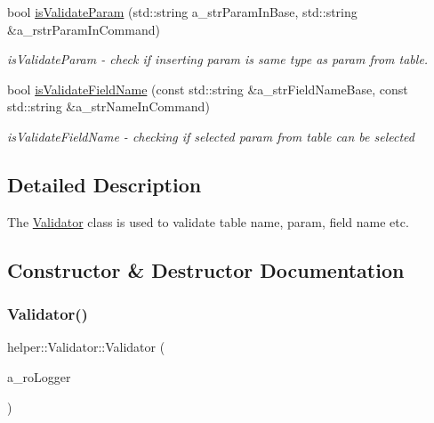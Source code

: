 \begin{DoxyCompactItemize}
bool \mbox{\hyperlink{classhelper_1_1_validator_ac2ff8db85b517ac2a1ccd4e20ec13889}{is\+Validate\+Param}} (std\+::string a\+\_\+str\+Param\+In\+Base, std\+::string \&a\+\_\+rstr\+Param\+In\+Command)
\begin{DoxyCompactList}\small\item\em is\+Validate\+Param -\/ check if inserting param is same type as param from table. \end{DoxyCompactList}\item 
bool \mbox{\hyperlink{classhelper_1_1_validator_ab0e104f0d9f8701af8b9b7980ea13ec4}{is\+Validate\+Field\+Name}} (const std\+::string \&a\+\_\+str\+Field\+Name\+Base, const std\+::string \&a\+\_\+str\+Name\+In\+Command)
\begin{DoxyCompactList}\small\item\em is\+Validate\+Field\+Name -\/ checking if selected param from table can be selected \end{DoxyCompactList}\end{DoxyCompactItemize}


\subsection{Detailed Description}
The \mbox{\hyperlink{classhelper_1_1_validator}{Validator}} class is used to validate table name, param, field name etc. 

\subsection{Constructor \& Destructor Documentation}
\mbox{\label{classhelper_1_1_validator_aa3ab86f79a0bf6c523bd5379661d58f6}} 
\subsubsection{\texorpdfstring{Validator()}{Validator()}}
{\footnotesize\ttfamily helper\+::\+Validator\+::\+Validator (\begin{DoxyParamCaption}\item[{const \mbox{\hyperlink{classi_logger}{i\+Logger}} \&}]{a\+\_\+ro\+Logger }\end{DoxyParamCaption})\hspace{0.3cm}{\ttfamily [explicit]}}



